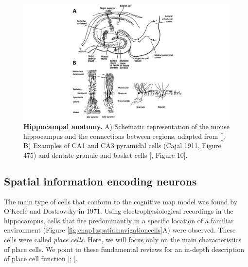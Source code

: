 \begin{figure}
    \centering
    \includegraphics[trim={200 0 200 0},clip, width=\textwidth]{Figures/Chapter1/intro_fig_hipp_anat.pdf}
    \caption[Hippocampal anatomy.]{\textbf{Hippocampal anatomy.} A) Schematic representation of the mouse hippocampus and the connections between regions, adapted from [\cite{okeefebook}]. 
    B) Examples of CA1 and CA3 pyramidal cells (Cajal 1911, Figure 475) and dentate granule and basket cells [\cite{lorente1934}, Figure 10].}
    \label{fig:chap1:hippocampal_anat}
\end{figure}

\subsection{Spatial information encoding neurons}
\label{chap1:sec:1:subsec2:spat_info_cells}
The main type of cells that conform to the cognitive map model was found by O’Keefe and Dostrovsky in 1971. 
Using electrophysiological recordings in the hippocampus, cells that fire predominantly in a specific location of a familiar environment (Figure \ref{fig:chap1:spatialnavigationcells}A) were observed.
These cells were called \textit{place cells}. 
Here, we will focus only on the main characteristics of place cells. 
We point to these fundamental reviews for an in-depth description of place cell function [\cite{moser2015place}; \cite{best2001spatial}].

